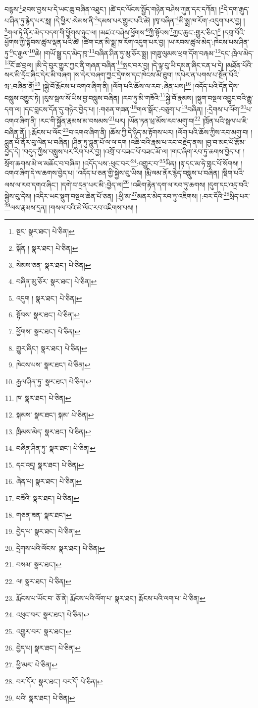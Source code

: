 བརྙས་\footnote{སྔང་  སྣར་ཐང་།  པེ་ཅིན། }ཐབས་བྱས་པ་དེ་ཡང་ཆུ་བཞིན་འཐུང་། །ཚེ་དང་ལོངས་སྤྱོད་གཉེན་བཤེས་ཀུན་དར་དཀོན། །\footnote{སྐོན །  སྣར་ཐང་།  པེ་ཅིན། }དེ་དག་རྒུད་པ་ཤིན་ཏུ་རྙེད་པར་སླ། །དེ་ཕྱིར་:སེམས་ནི་\footnote{སེམས་ཅན་  སྣར་ཐང་།  པེ་ཅིན། }དམས་པར་གྱུར་པའི་ཚེ། །ཁྭ་བཞིན་\footnote{བཞིན་མུ་ཅོར་  སྣར་ཐང་།  པེ་ཅིན། }མི་སྨྲ་ཁ་རོག་:འདུག་པར་བྱ། །\footnote{འདུག །  སྣར་ཐང་།  པེ་ཅིན། }གལ་ཏེ་ནོར་མེད་བདག་གི་ཕྱོགས་ཉུང་ལ། །མཛའ་བཤེས་ཕྱོགས་\footnote{སྟོབས་  སྣར་ཐང་།  པེ་ཅིན། }ཀྱི་སྟོབས་\footnote{ཕྱོགས་  སྣར་ཐང་།  པེ་ཅིན། }ཀྱང་ཆུང་:གྱུར་ཅིང་།\footnote{གྱུར་ཞིང་།  སྣར་ཐང་།  པེ་ཅིན། } །དགྲ་བོའི་ཕྱོགས་ཀྱི་སྟོབས་ཚུལ་ལྡན་པའི་ཚེ། །ཚིག་ངན་མི་སྨྲ་ཁ་རོག་འདུག་པར་བྱ། །ཡ་རབས་ཚུལ་མེད་:ཁེངས་པས་ཤིན་ཏུ་\footnote{ཁེངས་པས་  སྣར་ཐང་།  པེ་ཅིན། }ང་རྒྱལ་\footnote{རྒྱལ་ཤིན་ཏུ་  སྣར་ཐང་།  པེ་ཅིན། }ཆེ། །གཡོ་སྒྱུ་དད་མེད་ཁྭ་\footnote{ཁ་  སྣར་ཐང་།  པེ་ཅིན། }བཞིན་ཤིན་ཏུ་མུ་ཅོར་སྨྲ། །གཟུ་ལུམས་ཕྲག་དོག་བརྐམ་\footnote{སྐམས་  སྣར་ཐང་། སྐམ་  པེ་ཅིན། }དང་:ཁྲེལ་མེད་\footnote{ཁྲིམས་མེད་  སྣར་ཐང་།  པེ་ཅིན། }ངོ་ཚ་བྲལ། །མི་དེ་བུར་གྱུར་ཀྱང་ནི་གཞན་བཞིན་\footnote{བཞིན་ཤིན་ཏུ་  སྣར་ཐང་།  པེ་ཅིན། }སྤང་བར་བྱ། །དེ་ལྟ་བུ་ཡི་དམན་ཞིང་ངན་པ་དེ། །མཐོན་པོའི་སར་མི་དྲོང་ཞིང་དེར་མི་བཞག །ས་དེར་བཞག་ཀྱང་དྲེགས་དང་ཁེངས་མི་ཐུབ། །དཔེར་ན་པགས་པ་སྔོན་པོའི་ཝ་:བཞིན་ནོ།\footnote{དང་འདྲ།  སྣར་ཐང་།  པེ་ཅིན། } །སྐྱེ་བོ་རྨོངས་པ་འགའ་ཞིག་ནི། །ལོག་པའི་ཆོས་ལ་རབ་:ཞེན་པས།\footnote{ཞེན་པ།  སྣར་ཐང་།  པེ་ཅིན། } །འདོད་པའི་དོན་དེས་བསླུས་འགྱུར་ཏེ། །རུས་སྦལ་སོ་ཡིས་བྱ་བསླུས་བཞིན། །རབ་ཏུ་མི་གཟོའི་\footnote{བཟོའི་  སྣར་ཐང་།  པེ་ཅིན། }སྐྱེ་བོ་རྣམས། །སྡུག་བསྔལ་འབྱུང་བའི་རྒྱུ་དག་ལ། །དང་བླངས་དོན་དུ་གཉེར་བྱེད་པ། །:གཅན་གཟན་\footnote{གཅན་ཟན་  སྣར་ཐང་། }གལ་སྒོར་:བཅུག་པ་\footnote{བྱེད་པ་  སྣར་ཐང་།  པེ་ཅིན། }བཞིན། །:དྲེགས་པ་ལོག་\footnote{དྲེགས་པའི་ལོངས་  སྣར་ཐང་།  པེ་ཅིན། }པ་འགའ་ཞིག་ནི། །རང་གི་སྐྱོན་རྣམས་མ་བསམས་\footnote{བསམ་  སྣར་ཐང་། }པར། །ཡོན་ཏན་ཕྲ་མོས་རབ་མགུ་བ།\footnote{ལ།  སྣར་ཐང་།  པེ་ཅིན། } །ཁྲོན་པའི་སྦལ་པ་ཇི་བཞིན་ནོ། །:རྨོངས་པ་ལོང་\footnote{རྨོངས་པ་ཡོང་བ་  ཅོ་ནེ། རྨོངས་པའི་ལོག་པ་  སྣར་ཐང་། རྨོངས་པའི་ལག་པ་  པེ་ཅིན། }བ་འགའ་ཞིག་ནི། །ཆོས་ཀྱི་དེ་ཉིད་མ་རྟོགས་པར། །ལོག་པའི་ཆོས་ཀྱིས་རབ་མགུ་བ། །བླུན་པོ་ནོར་བུ་ལེན་པ་བཞིན། །ཤིན་ཏུ་བླུན་པོ་ལ་ལ་དག །འཆི་བའི་རྣམ་པ་རབ་བརྗེད་ནས། །བྱ་བ་མང་པོ་རྩོམ་བྱེད་དེ། །བདུད་ཀྱིས་བསླུས་པར་རིག་པར་བྱ། །འགྲོ་བ་བཟང་པོ་བཟང་མོ་ལ། །གང་ཞིག་རབ་ཏུ་ཆགས་བྱེད་པ། །སྲོག་ཆགས་མེ་ལ་མཆོང་བ་བཞིན། །འདོད་པས་:ཕུང་བར་\footnote{འཕུང་བར་  སྣར་ཐང་།  པེ་ཅིན། }:འགྱུར་བ་\footnote{འགྱུར་བར་  སྣར་ཐང་། }ཡིན། །རྟ་དང་མ་ཧེ་གླང་པོ་སོགས། །འགའ་ཞིག་དེ་ལ་ཆགས་བྱེད་པ། །འདོད་པ་ཅན་གྱི་སྐྱེས་བུ་ཡིས། །རྨི་ལམ་ནོར་རྙེད་བསླུས་པ་བཞིན། །སྡིག་པའི་ལས་ལ་རབ་དགའ་ཞིང་། །དགེ་བ་དྲན་པར་མི་:བྱེད་ལ།\footnote{བྱེད་པ།  སྣར་ཐང་།  པེ་ཅིན། } །འཇིག་རྟེན་དག་ལ་རབ་ཏུ་ཆགས། །དུག་དང་འདྲ་བའི་སྐྱེས་བུ་དེས། །འདིར་ཡང་སྡུག་བསྔལ་ཆེན་པོ་ཅན། །:ཕྱི་མ་\footnote{ཕྱི་མར་  པེ་ཅིན། }མནར་མེད་རབ་ཏུ་འཇིགས། །:བར་དོའི་\footnote{བར་དོར་  སྣར་ཐང་། བར་དོ་  པེ་ཅིན། }སྲིད་པར་\footnote{པའི་  སྣར་ཐང་།  པེ་ཅིན། }ལས་རྣམས་དྲན། །གསལ་བའི་མེ་ལོང་རབ་འཇིགས་པས། །
